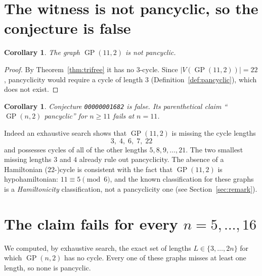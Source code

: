 \documentclass[11pt]{article}
\newtheorem{corollary}[theorem]{Corollary}
\theoremstyle{definition}
\theoremstyle{remark}
\newcommand{\GP}{\operatorname{GP}}
\begin{document}
\section{The witness is not pancyclic, so the conjecture is false}

\begin{corollary}\label{cor:notpan}
The graph $\GP(11,2)$ is not pancyclic.
\end{corollary}

\begin{proof}
By Theorem~\ref{thm:trifree} it has no $3$-cycle. Since $|V(\GP(11,2))| = 22$,
pancyclicity would require a cycle of length $3$ (Definition~\ref{def:pancyclic}),
which does not exist.
\end{proof}

\begin{corollary}
Conjecture \texttt{00000001682} is false. Its parenthetical claim
``$\GP(n,2)$ pancyclic'' for $n \ge 11$ fails at $n = 11$.
\end{corollary}

Indeed an exhaustive search shows that $\GP(11,2)$ is missing the cycle lengths
\[
3,\; 4,\; 6,\; 7,\; 22
\]
and possesses cycles of all of the other lengths $5, 8, 9, \dots, 21$. The two
smallest missing lengths $3$ and $4$ already rule out pancyclicity. The absence
of a Hamiltonian ($22$-)cycle is consistent with the fact that
$\GP(11,2)$ is hypohamiltonian: $11 \equiv 5 \pmod 6$, and the known
classification for these graphs is a \emph{Hamiltonicity} classification, not a
pancyclicity one (see Section~\ref{sec:remark}).

\section{The claim fails for every $n = 5, \dots, 16$}

We computed, by exhaustive search, the exact set of lengths $L \in \{3,\dots,2n\}$
for which $\GP(n,2)$ has no cycle. Every one of these graphs misses at least one
length, so none is pancyclic.
\end{document}
